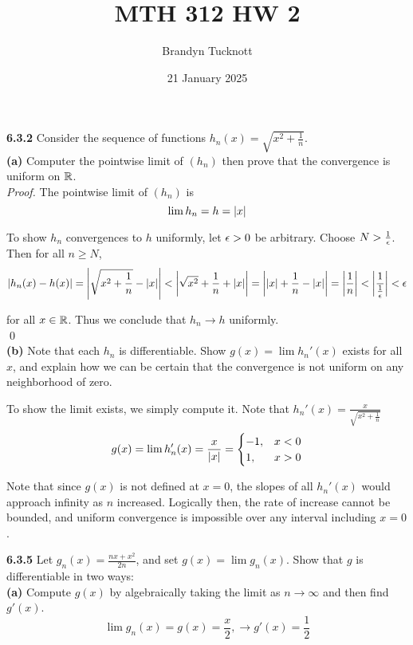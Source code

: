 \documentclass{exam}
\title{MTH 312 HW 2}
\author{Brandyn Tucknott}
\date{21 January 2025}
\begin{document}
\maketitle

\begin{questions}
    \textbf{6.3.2 }
Consider the sequence of functions $h_n(x) = \sqrt{x^2 + \frac{1}{n}}$. \\

\textbf{(a) } Computer the pointwise limit of $(h_n)$ then prove that the convergence is uniform on $\mathbb {R}$. \\
\textit{Proof. }
The pointwise limit of $(h_n)$ is
$$\lim h_n = h = \left| x \right|$$

To show $h_n$ convergences to $h$ uniformly, let $\epsilon > 0$ be arbitrary. Choose $N > \frac{1}{\epsilon}$. Then for all $n \geq N$,
$$\left| h_n(x) - h(x) \right| = \left| \sqrt{x^2 + \frac{1}{n}} - \left| x \right| \right| < \left| \sqrt{x^2} + \frac{1}{n} + \left| x \right| \right| = \left| \left| x \right| + \frac{1}{n} - \left| x \right| \right| = \left| \frac{1}{n} \right| < \left| \frac{1}{\frac{1}{\epsilon}} \right| < \epsilon$$

for all $x \in \mathbb {R}$. Thus we conclude that $h_n \rightarrow h$ uniformly. \\ \qed \\


\textbf{(b) } Note that each $h_n$ is differentiable. Show $g(x) = \lim h_n'(x)$ exists for all $x$, and explain how we can be certain that the convergence is not uniform on any neighborhood of zero.

\sol
To show the limit exists, we simply compute it. Note that $h_n'(x) = \frac{x}{\sqrt{x^2 + \frac{1}{n}}}$
$$g(x) = \lim h_n'(x) = \frac{x}{\left| x \right|} = \begin{cases}
    -1, & x < 0 \\
    1, & x > 0 \\
\end{cases}$$

Note that since $g(x)$ is not defined at $x = 0$, the slopes of all $h_n'(x)$ would approach infinity as $n$ increased. Logically then, the rate of increase cannot be bounded, and uniform convergence is impossible over any interval including $x = 0$.

\newpage
\textbf{6.3.5 }
Let $g_n(x) = \frac{nx + x^2}{2n}$, and set $g(x) = \lim g_n(x)$. Show that $g$ is differentiable in two ways: \\

\textbf{(a) } Compute $g(x)$ by algebraically taking the limit as $n \rightarrow \infty$ and then find $g'(x)$.
\sol
$$\lim g_n(x) = g(x) = \frac{x}{2}, \longrightarrow g'(x) = \frac{1}{2}$$ \\


\end{questions}
\end{document}
